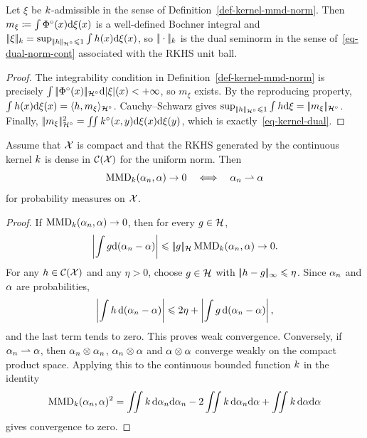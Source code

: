 \begin{prop}
\label{prop-kernel-rkhs-dual}
	Let $\xi$ be $k$-admissible in the sense of Definition~\ref{def-kernel-mmd-norm}. Then
	$m_\xi\coloneqq\int\Phi^\circ(x)\mathrm{d}\xi(x)$ is a well-defined Bochner integral and
	$|\!| \xi |\!|_{k}
	=\sup_{|\!| h |\!|_{\mathcal{H}^\circ}\leqslant1}\int h(x)\mathrm{d}\xi(x)$,
	so $|\!| \cdot |\!|_{k}$ is the dual seminorm in the sense of~\eqref{eq-dual-norm-cont} associated with the RKHS unit ball.
\end{prop}
\begin{proof}
	The integrability condition in Definition~\ref{def-kernel-mmd-norm} is precisely $\int|\!| \Phi^\circ(x) |\!|_{\mathcal{H}^\circ}\mathrm{d}|\xi|(x)<+\infty$, so $m_\xi$ exists. By the reproducing property,
	$\int h(x)\mathrm{d}\xi(x)
	=\langle h,m_\xi\rangle_{\mathcal{H}^\circ}$.
	Cauchy--Schwarz gives
	$\sup_{|\!| h |\!|_{\mathcal{H}^\circ}\leqslant1}\int h\mathrm{d}\xi=|\!| m_\xi |\!|_{\mathcal{H}^\circ}$.
	Finally,
	$|\!| m_\xi |\!|_{\mathcal{H}^\circ}^2
	=\iint k^\circ(x,y)\mathrm{d}\xi(x)\mathrm{d}\xi(y)$,
	which is exactly~\eqref{eq-kernel-dual}.
\end{proof}

\begin{prop}\label{prop-mmd-metrization}
	Assume that $\mathcal{X}$ is compact and that the RKHS generated by the continuous kernel $k$ is dense in $\mathcal{C}(\mathcal{X})$ for the uniform norm. Then
	\[
		\operatorname{MMD}_{k}(\alpha_n,\alpha)\to0
		\quad\Longleftrightarrow\quad
		\alpha_n\rightharpoonup\alpha
	\]
	for probability measures on $\mathcal{X}$.
\end{prop}
\begin{proof}
	If $\operatorname{MMD}_{k}(\alpha_n,\alpha)\to0$, then for every $g\in\mathcal{H}$,
	\[
		\left\lvert\int g\mathrm{d}(\alpha_n-\alpha)\right\rvert
		\leqslant |\!| g |\!|_{\mathcal{H}}\operatorname{MMD}_{k}(\alpha_n,\alpha)\to0.
	\]
	For any $h\in\mathcal{C}(\mathcal{X})$ and any $\eta>0$, choose $g\in\mathcal{H}$ with $|\!| h-g |\!|_\infty\leqslant\eta$. Since $\alpha_n$ and $\alpha$ are probabilities,
	\[
		\left|\int h\,\mathrm{d}(\alpha_n-\alpha)\right|
		\leqslant
		2\eta+\left|\int g\,\mathrm{d}(\alpha_n-\alpha)\right|,
	\]
	and the last term tends to zero. This proves weak convergence. Conversely, if $\alpha_n\rightharpoonup\alpha$, then $\alpha_n\otimes\alpha_n$, $\alpha_n\otimes\alpha$ and $\alpha\otimes\alpha$ converge weakly on the compact product space. Applying this to the continuous bounded function $k$ in the identity
	\[
		\MMD_{\Krkhs}(\al_n,\al)^2
\index{maximum mean discrepancy}%
		=
		\iint \Krkhs\,\d\al_n\d\al_n
		-2\iint \Krkhs\,\d\al_n\d\al
		+\iint \Krkhs\,\d\al\d\al
	\]
	gives convergence to zero.
\end{proof}


